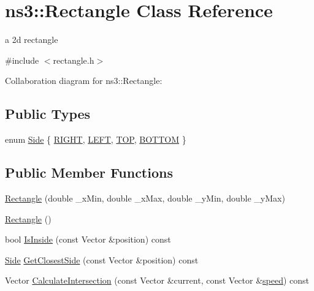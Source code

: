 \hypertarget{classns3_1_1Rectangle}{}\section{ns3\+:\+:Rectangle Class Reference}
\label{classns3_1_1Rectangle}


a 2d rectangle  




{\ttfamily \#include $<$rectangle.\+h$>$}



Collaboration diagram for ns3\+:\+:Rectangle\+:
\subsection*{Public Types}
\begin{DoxyCompactItemize}
\item 
enum \hyperlink{classns3_1_1Rectangle_ac04d366f3d1e980f528c83a43b724fed}{Side} \{ \hyperlink{classns3_1_1Rectangle_ac04d366f3d1e980f528c83a43b724feda6c560125ea6b91362ced5a1428047299}{R\+I\+G\+HT}, 
\hyperlink{classns3_1_1Rectangle_ac04d366f3d1e980f528c83a43b724feda67ba110ffaf72e2d655f5d2e3b02335b}{L\+E\+FT}, 
\hyperlink{classns3_1_1Rectangle_ac04d366f3d1e980f528c83a43b724fedab9b10ad97f915fba0af133e872e69be2}{T\+OP}, 
\hyperlink{classns3_1_1Rectangle_ac04d366f3d1e980f528c83a43b724feda040dbf3009db18216791ee4efce40ba8}{B\+O\+T\+T\+OM}
 \}
\end{DoxyCompactItemize}
\subsection*{Public Member Functions}
\begin{DoxyCompactItemize}
\item 
\hyperlink{classns3_1_1Rectangle_aa94c149b72de055d77d64af921de3f28}{Rectangle} (double \+\_\+x\+Min, double \+\_\+x\+Max, double \+\_\+y\+Min, double \+\_\+y\+Max)
\item 
\hyperlink{classns3_1_1Rectangle_aef6b0d4478873c37a37b0acbe9884aa6}{Rectangle} ()
\item 
bool \hyperlink{classns3_1_1Rectangle_a152c82b09b470eb5eea53776182e6e69}{Is\+Inside} (const Vector \&position) const 
\item 
\hyperlink{classns3_1_1Rectangle_ac04d366f3d1e980f528c83a43b724fed}{Side} \hyperlink{classns3_1_1Rectangle_a622a90802fa3b050b91d36d55c58a478}{Get\+Closest\+Side} (const Vector \&position) const 
\item 
Vector \hyperlink{classns3_1_1Rectangle_a90814c705130992d444d19b0197f1f7e}{Calculate\+Intersection} (const Vector \&current, const Vector \&\hyperlink{mmwave-amc-test_8cc_a6dc6e6f3c75c509ce943163afb5dade7}{speed}) const 
\end{DoxyCompactItemize}
